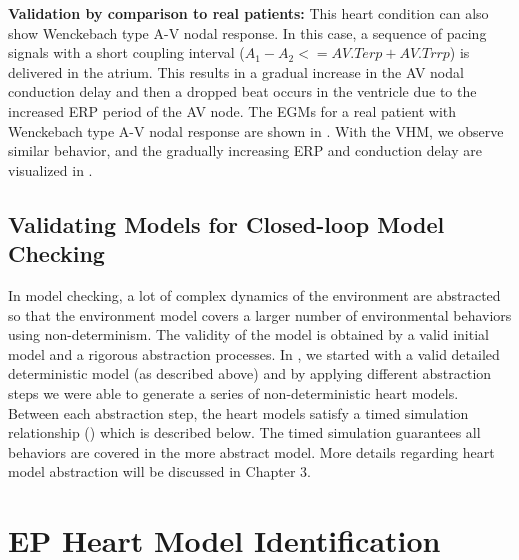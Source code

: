 \noindent\textbf{Validation by comparison to real patients:} This heart condition can also show Wenckebach type A-V nodal response. In this case, a sequence of pacing signals with a short coupling interval ($A_1-A_2<=AV.Terp+AV.Trrp$) is delivered in the atrium. This results in a gradual increase in the AV nodal conduction delay and then a dropped beat occurs in the ventricle due to the increased ERP period of the AV node. The EGMs for a real patient with Wenckebach type A-V nodal response are shown in . With the VHM, we observe similar behavior, and the gradually increasing ERP and conduction delay are visualized in .
\subsection{Validating Models for Closed-loop Model Checking}
In model checking, a lot of complex dynamics of the environment are abstracted so that the environment model covers a larger number of environmental behaviors using non-determinism. The validity of the model is obtained by a valid initial model and a rigorous abstraction processes. In \cite{STTT13}, we started with a valid detailed deterministic model (as described above) and by applying different abstraction steps we were able to generate a series of non-deterministic heart models. Between each abstraction step, the heart models satisfy a timed simulation relationship (\cite{simulation}) which is described below. The timed simulation guarantees all behaviors are covered in the more abstract model.
More details regarding heart model abstraction will be discussed in Chapter 3.

\section{EP Heart Model Identification}

